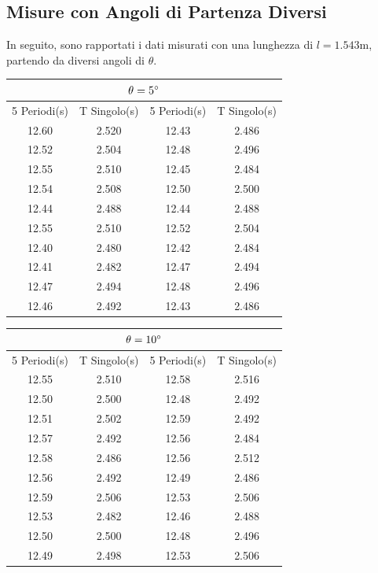 \documentclass[a4paper]{article}
\begin{document}
\subsection{Misure con Angoli di Partenza Diversi} \label{Misura 1.50 metro}
In seguito, sono rapportati i dati misurati con una lunghezza di $l=1.543$m, partendo da diversi angoli di $\theta$.

\begin{center}
    \begin{tabular}{|c|c|c|c|}
    \hline
    \multicolumn{4}{|c|}{$\theta=5\degree$} \\
    \hline
    5 Periodi(s) & T Singolo(s) & 5 Periodi(s) & T Singolo(s) \\
    \hline
     12.60 & 2.520 & 12.43 & 2.486 \\
     12.52 & 2.504 & 12.48 & 2.496 \\
     12.55 & 2.510 & 12.45 & 2.484 \\
     12.54 & 2.508 & 12.50 & 2.500 \\
     12.44 & 2.488 & 12.44 & 2.488 \\
     12.55 & 2.510 & 12.52 & 2.504 \\
     12.40 & 2.480 & 12.42 & 2.484 \\
     12.41 & 2.482 & 12.47 & 2.494 \\
     12.47 & 2.494 & 12.48 & 2.496 \\
     12.46 & 2.492 & 12.43 & 2.486 \\
    \hline
    \end{tabular}
\end{center}

\begin{center}
    \begin{tabular}{|c|c|c|c|}
    \hline
    \multicolumn{4}{|c|}{$\theta=10\degree$} \\
    \hline
    5 Periodi(s) & T Singolo(s) & 5 Periodi(s) & T Singolo(s) \\
    \hline
    12.55 & 2.510 & 12.58 & 2.516 \\
    12.50 & 2.500 & 12.48 & 2.492 \\
    12.51 & 2.502 & 12.59 & 2.492 \\
    12.57 & 2.492 & 12.56 & 2.484 \\
    12.58 & 2.486 & 12.56 & 2.512 \\
    12.56 & 2.492 & 12.49 & 2.486 \\
    12.59 & 2.506 & 12.53 & 2.506 \\
    12.53 & 2.482 & 12.46 & 2.488 \\
    12.50 & 2.500 & 12.48 & 2.496 \\
    12.49 & 2.498 & 12.53 & 2.506 \\
    \hline
    \end{tabular}
\end{center}
\end{document}
